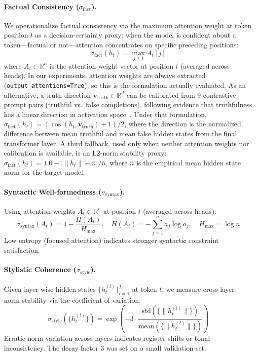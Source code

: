 \documentclass[11pt]{article}
\begin{document}
\paragraph{Factual Consistency ($\sigma_{\text{fact}}$).}
We operationalize factual consistency via the maximum attention weight at token position $t$ as a decision-certainty proxy: when the model is confident about a token---factual or not---attention concentrates on specific preceding positions:
\begin{equation}
\sigma_{\text{fact}}(h_t) = \max_{j \leq t} A_t[j]
\end{equation}
where $A_t \in \mathbb{R}^n$ is the attention weight vector at position $t$ (averaged across heads). In our experiments, attention weights are always extracted (\texttt{output\_attentions=True}), so this is the formulation actually evaluated. As an alternative, a truth direction $\mathbf{v}_{\text{truth}} \in \mathbb{R}^d$ can be calibrated from 9 contrastive prompt pairs (truthful vs.\ false completions), following evidence that truthfulness has a linear direction in activation space~\cite{burns2022discovering}. Under that formulation, $\sigma_{\text{fact}}(h_t) = (\cos(h_t, \mathbf{v}_{\text{truth}}) + 1)/2$, where the direction is the normalized difference between mean truthful and mean false hidden states from the final transformer layer. A third fallback, used only when neither attention weights nor calibration is available, is an L2-norm stability proxy: $\sigma_{\text{fact}}(h_t) = 1.0 - |\|h_t\| - \bar{n}|/\bar{n}$, where $\bar{n}$ is the empirical mean hidden state norm for the target model.

\paragraph{Syntactic Well-formedness ($\sigma_{\text{syntax}}$).}
Using attention weights $A_t \in \mathbb{R}^n$ at position $t$ (averaged across heads):
\begin{equation}
\sigma_{\text{syntax}}(A_t) = 1 - \frac{H(A_t)}{H_{\max}}, \quad H(A_t) = -\sum_{j=1}^{n} a_j \log a_j, \quad H_{\max} = \log n
\end{equation}
Low entropy (focused attention) indicates stronger syntactic constraint satisfaction.

\paragraph{Stylistic Coherence ($\sigma_{\text{style}}$).}
Given layer-wise hidden states $\{h_t^{(l)}\}_{l=1}^{L}$ at token $t$, we measure cross-layer norm stability via the coefficient of variation:
\begin{equation}
\sigma_{\text{style}}(\{h_t^{(l)}\}) = \exp\left(-3 \cdot \frac{\text{std}(\{\|h_t^{(l)}\|\})}{\text{mean}(\{\|h_t^{(l)}\|\})}\right)
\end{equation}
Erratic norm variation across layers indicates register shifts or tonal inconsistency. The decay factor 3 was set on a small validation set.
\end{document}

